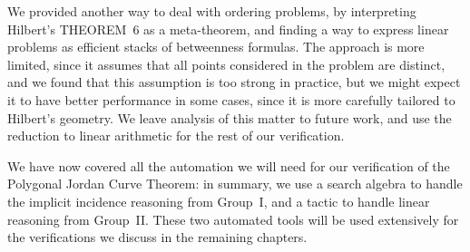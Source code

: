 We provided another way to deal with ordering problems, by interpreting Hilbert's THEOREM~6 as a meta-theorem, and finding a way to express linear problems as efficient stacks of betweenness formulas. The approach is more limited, since it assumes that all points considered in the problem are distinct, and we found that this assumption is too strong in practice, but we might expect it to have better performance in some cases, since it is more carefully tailored to Hilbert's geometry. We leave analysis of this matter to future work, and use the reduction to linear arithmetic for the rest of our verification.

We have now covered all the automation we will need for our verification of the Polygonal Jordan Curve Theorem: in summary, we use a search algebra to handle the implicit incidence reasoning from Group~I, and a tactic to handle linear reasoning from Group~II. These two automated tools will be used extensively for the verifications we discuss in the remaining chapters. 


